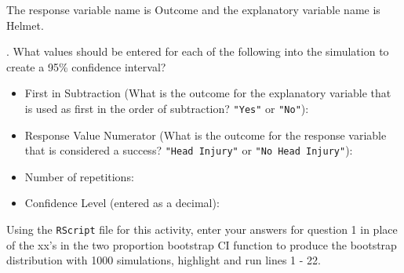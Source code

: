 \documentclass[
]{report}
\providecommand{\tightlist}{%
  \setlength{\itemsep}{0pt}\setlength{\parskip}{0pt}}
\begin{document}
The response variable name is Outcome and the explanatory variable name is Helmet.


. What values should be entered for each of the following into the simulation to create a 95\% confidence interval?

\vspace{.5mm}

\begin{itemize}
\tightlist
\item
  First in Subtraction (What is the outcome for the explanatory variable that is used as first in the order of subtraction? \texttt{"Yes"} or \texttt{"No"}):
\end{itemize}

\vspace{.2in}

\begin{itemize}
\tightlist
\item
  Response Value Numerator (What is the outcome for the response variable that is considered a success? \texttt{"Head\ Injury"} or \texttt{"No\ Head\ Injury"}):
\end{itemize}

\vspace{.2in}

\begin{itemize}
\tightlist
\item
  Number of repetitions:
\end{itemize}

\vspace{.2in}

\begin{itemize}
\tightlist
\item
  Confidence Level (entered as a decimal):
\end{itemize}

\vspace{.2in}

Using the \texttt{RScript} file for this activity, enter your answers for question 1 in place of the xx's in the two proportion bootstrap CI function to produce the bootstrap distribution with 1000 simulations, highlight and run lines 1 - 22.
\end{document}
